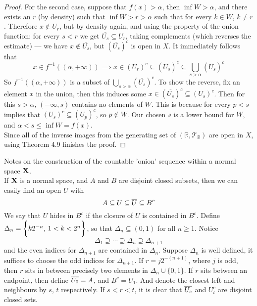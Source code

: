 \documentclass[../main-manifolds.tex]{subfiles}
\begin{document}
\begin{proof}
For the second case, suppose that $f(x)>\alpha$, then $\inf W>\alpha$, and there exists an $r$ (by density) such that $\inf W>r>\alpha$ such that for every $k\in W$, $k\neq r$. Therefore $x\notin U_r$, but by density again, and using the property of the onion function: for every $s<r$ we get $\overline{U_s}\subseteq U_r$, taking complements (which reverses the estimate) — we have $x\notin \overline{U_s}$, but $\left(\overline{U_s}\right)^c$ is open in $X$. It immediately follows that
\[
x\in f^{-1}((\alpha,+\infty))\implies x\in (U_r)^c\subseteq \left(\overline{U_s}\right)^c\subseteq\bigcup_{s>\alpha}\left(\overline{U_s}\right)^c
\]
So $f^{-1}((\alpha,+\infty))$ is a subset of $\bigcup_{s>\alpha}\left(\overline{U_s}\right)^c$. To show the reverse, fix an element $x$ in the union, then this induces some $x\in \left(\overline{U_s}\right)^c\subseteq (U_s)^c$. Then for this $s>\alpha$, $(-\infty,s)$ contains no elements of $W$. This is because for every $p<s$ implies that $(U_s)^c\subseteq(U_p)^c$, so $p\notin W$. Our chosen $s$ is a lower bound for $W$, and $\alpha<s\leq\inf W =f(x)$.\\

Since all of the inverse images from the generating set of $(\mathbb{R},\mathcal{T}_{\mathbb{R}})$ are open in $X$, using Theorem 4.9 finishes the proof.
\end{proof}

Notes on the construction of the countable 'onion' sequence within a normal space ${\mathbf{X}}$.\\

If ${\mathbf{X}}$ is a normal space, and $A$ and $B$ are disjoint closed subsets, then we can easily find an open $U$ with
\begin{equation}\label{eq:UrysohnLemma-Seashells}
    A\subseteq U \subseteq \overline{U}\subseteq B^c
\end{equation}
We say that $U$ hides in $B^c$ if the closure of $U$ is contained in $B^c$. Define $\Delta_n = \biggl\{{k2^{-n},\: 1 < k < 2^{n}}\biggr\}$, so that $\Delta_n\subseteq(0,1)$ for all $n\geq 1$. Notice 
\[
    \Delta_1\supseteq \cdots\supseteq \Delta_n\supseteq \Delta_{n+1}
\]
and the even indices for $\Delta_{n+1}$ are contained in $\Delta_n$. Suppose $\Delta_n$ is well defined, it suffices to choose the odd indices for $\Delta_{n+1}$. If $r = j2^{-(n+1)}$, where $j$ is odd, then $r$ sits in between precisely two elements in $\Delta_n\cup\{0,1\}$. If $r$ sits between an endpoint, then define $\overline{U_0} = A$, and $B^c = U_1$. And denote the closest left and neighbours by $s$, $t$ respectively. If $s<r<t$, it is clear that $\overline{U_s}$ and $U_t^c$ are disjoint closed sets.\\
\end{document}
